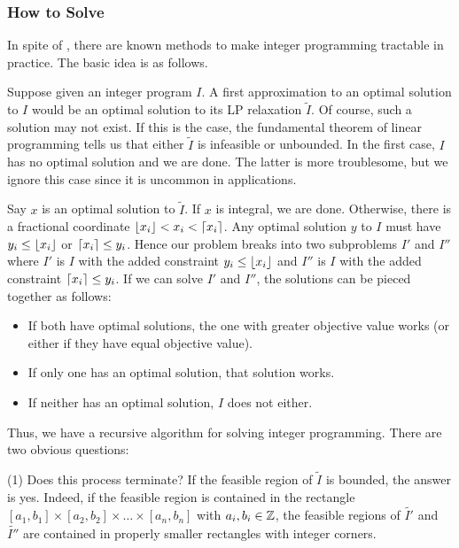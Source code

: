 \subsubsection{How to Solve}\label{solvingIP}

In spite of , there are known methods to make integer programming tractable in practice.
The basic idea is as follows.

Suppose given an integer program $I$.
A first approximation to an optimal solution to $I$ would be an optimal solution to its LP relaxation $\tilde{I}$.
Of course, such a solution may not exist. If this is the case, the fundamental theorem of linear programming tells us that either $\tilde{I}$ is infeasible or unbounded.
In the first case, $I$ has no optimal solution and we are done.
The latter is more troublesome, but we ignore this case since it is uncommon in applications.

Say $x$ is an optimal solution to $\tilde{I}$. If $x$ is integral, we are done.
Otherwise, there is a fractional coordinate $\left\lfloor x_i \right\rfloor < x_i < \left\lceil x_i \right\rceil$. Any optimal solution $y$ to $I$ must have $y_{i} \leq \left\lfloor x_i \right\rfloor$ or $\left\lceil x_i \right\rceil \leq y_i$.
Hence our problem breaks into two subproblems $I'$ and $I''$ where $I'$ is $I$ with the added constraint $y_{i} \leq \left\lfloor x_i \right\rfloor$ and $I''$ is $I$ with the added constraint $\left\lceil x_i \right\rceil \leq y_i$.
If we can solve $I'$ and $I''$, the solutions can be pieced together as follows:

\begin{itemize}
    \item If both have optimal solutions, the one with greater objective value works (or either if they have equal objective value).
    \item If only one has an optimal solution, that solution works.
    \item If neither has an optimal solution, $I$ does not either.
\end{itemize}

Thus, we have a recursive algorithm for solving integer programming.
There are two obvious questions:

(1) Does this process terminate?
If the feasible region of $\tilde{I}$ is bounded, the answer is yes.
Indeed, if the feasible region is contained in the rectangle $[a_1, b_1] \times [a_2, b_2] \times \ldots \times [a_n, b_n]$ with $a_{i}, b_{i} \in \mathbb{Z}$, the feasible regions of $\tilde{I'}$ and $\tilde{I''}$ are contained in properly smaller rectangles with integer corners.

